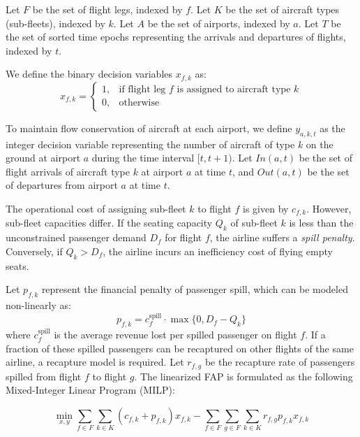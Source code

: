 \documentclass[11pt,a4paper]{book}
\begin{document}
Let $F$ be the set of flight legs, indexed by $f$. Let $K$ be the set of aircraft types (sub-fleets), indexed by $k$. Let $A$ be the set of airports, indexed by $a$. Let $T$ be the set of sorted time epochs representing the arrivals and departures of flights, indexed by $t$.

We define the binary decision variables $x_{f,k}$ as:
\begin{equation}
x_{f,k} = \begin{cases} 
1, & \text{if flight leg } f \text{ is assigned to aircraft type } k \\
0, & \text{otherwise}
\end{cases}
\end{equation}

To maintain flow conservation of aircraft at each airport, we define $y_{a,k,t}$ as the integer decision variable representing the number of aircraft of type $k$ on the ground at airport $a$ during the time interval $[t, t+1)$. Let $In(a, t)$ be the set of flight arrivals of aircraft type $k$ at airport $a$ at time $t$, and $Out(a, t)$ be the set of departures from airport $a$ at time $t$.

The operational cost of assigning sub-fleet $k$ to flight $f$ is given by $c_{f,k}$. However, sub-fleet capacities differ. If the seating capacity $Q_k$ of sub-fleet $k$ is less than the unconstrained passenger demand $D_f$ for flight $f$, the airline suffers a \textit{spill penalty}. Conversely, if $Q_k > D_f$, the airline incurs an inefficiency cost of flying empty seats.

Let $p_{f,k}$ represent the financial penalty of passenger spill, which can be modeled non-linearly as:
\begin{equation}
p_{f,k} = c^{\text{spill}}_f \cdot \max\{0, D_f - Q_k\}
\end{equation}
where $c^{\text{spill}}_f$ is the average revenue lost per spilled passenger on flight $f$. If a fraction of these spilled passengers can be recaptured on other flights of the same airline, a recapture model is required. Let $r_{f,g}$ be the recapture rate of passengers spilled from flight $f$ to flight $g$. The linearized FAP is formulated as the following Mixed-Integer Linear Program (MILP):

\begin{equation}
\min_{x, y} \sum_{f \in F} \sum_{k \in K} (c_{f,k} + p_{f,k}) x_{f,k} - \sum_{f \in F} \sum_{g \in F} \sum_{k \in K} r_{f,g} p_{f,k} x_{f,k}
\end{equation}
\end{document}
